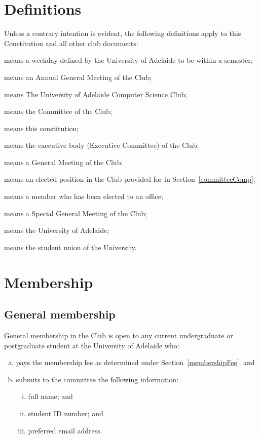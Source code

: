 \documentclass{constitution}
\begin{document}
\section{Definitions}\label{definitions}
Unless a contrary intention is evident, the following definitions apply to this Constitution and all other club documents:
\begin{description}
    \item {} means a weekday defined by the University of Adelaide to be within a semester;
    \item {} means an Annual General Meeting of the Club;
    \item {} means The University of Adelaide Computer Science Club;
    \item {} means the Committee of the Club;
    \item {} means this constitution;
    \item {} means the executive body (Executive Committee) of the Club;
    \item {} means a General Meeting of the Club;
    \item {} means an elected position in the Club provided for in Section~\ref{committeeComp};
    \item {} means a member who has been elected to an office;
    \item {} means a Special General Meeting of the Club;
    \item {} means the University of Adelaide;
    \item {} means the student union of the University.
\end{description}


\section{Membership}\label{membershipClub}

\subsection{General membership}\label{generalMembership}
General membership in the Club is open to any current undergraduate or postgraduate student at the University of Adelaide who:
\begin{enumerate}[(a)]
    \item pays the membership fee as determined under Section~\ref{membershipFee}; and
    \item submits to the committee the following information:
          \begin{enumerate}[(i)]
              \item full name; and
              \item student ID number; and
              \item preferred email address.
          \end{enumerate}
\end{enumerate}
\end{document}
